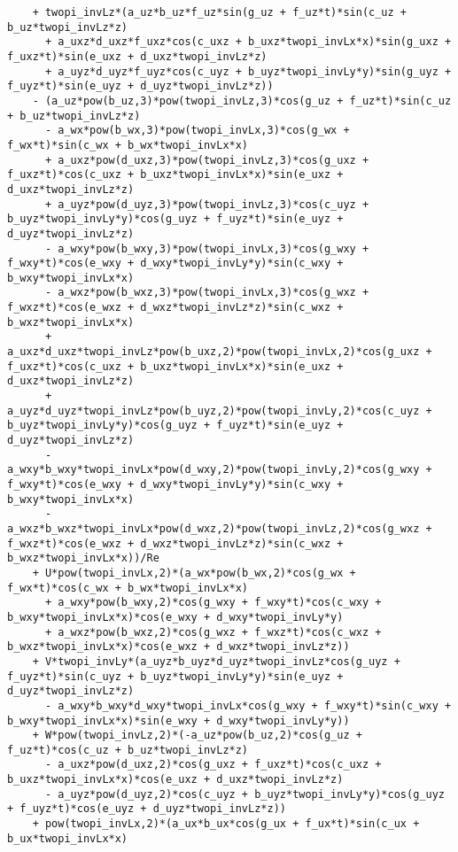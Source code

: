 \documentclass[10pt]{article}
\begin{document}
\begin{landscape}
\begin{footnotesize}
\begin{verbatim}
    + twopi_invLz*(a_uz*b_uz*f_uz*sin(g_uz + f_uz*t)*sin(c_uz + b_uz*twopi_invLz*z) 
      + a_uxz*d_uxz*f_uxz*cos(c_uxz + b_uxz*twopi_invLx*x)*sin(g_uxz + f_uxz*t)*sin(e_uxz + d_uxz*twopi_invLz*z) 
      + a_uyz*d_uyz*f_uyz*cos(c_uyz + b_uyz*twopi_invLy*y)*sin(g_uyz + f_uyz*t)*sin(e_uyz + d_uyz*twopi_invLz*z)) 
    - (a_uz*pow(b_uz,3)*pow(twopi_invLz,3)*cos(g_uz + f_uz*t)*sin(c_uz + b_uz*twopi_invLz*z) 
      - a_wx*pow(b_wx,3)*pow(twopi_invLx,3)*cos(g_wx + f_wx*t)*sin(c_wx + b_wx*twopi_invLx*x) 
      + a_uxz*pow(d_uxz,3)*pow(twopi_invLz,3)*cos(g_uxz + f_uxz*t)*cos(c_uxz + b_uxz*twopi_invLx*x)*sin(e_uxz + d_uxz*twopi_invLz*z) 
      + a_uyz*pow(d_uyz,3)*pow(twopi_invLz,3)*cos(c_uyz + b_uyz*twopi_invLy*y)*cos(g_uyz + f_uyz*t)*sin(e_uyz + d_uyz*twopi_invLz*z) 
      - a_wxy*pow(b_wxy,3)*pow(twopi_invLx,3)*cos(g_wxy + f_wxy*t)*cos(e_wxy + d_wxy*twopi_invLy*y)*sin(c_wxy + b_wxy*twopi_invLx*x) 
      - a_wxz*pow(b_wxz,3)*pow(twopi_invLx,3)*cos(g_wxz + f_wxz*t)*cos(e_wxz + d_wxz*twopi_invLz*z)*sin(c_wxz + b_wxz*twopi_invLx*x) 
      + a_uxz*d_uxz*twopi_invLz*pow(b_uxz,2)*pow(twopi_invLx,2)*cos(g_uxz + f_uxz*t)*cos(c_uxz + b_uxz*twopi_invLx*x)*sin(e_uxz + d_uxz*twopi_invLz*z) 
      + a_uyz*d_uyz*twopi_invLz*pow(b_uyz,2)*pow(twopi_invLy,2)*cos(c_uyz + b_uyz*twopi_invLy*y)*cos(g_uyz + f_uyz*t)*sin(e_uyz + d_uyz*twopi_invLz*z) 
      - a_wxy*b_wxy*twopi_invLx*pow(d_wxy,2)*pow(twopi_invLy,2)*cos(g_wxy + f_wxy*t)*cos(e_wxy + d_wxy*twopi_invLy*y)*sin(c_wxy + b_wxy*twopi_invLx*x) 
      - a_wxz*b_wxz*twopi_invLx*pow(d_wxz,2)*pow(twopi_invLz,2)*cos(g_wxz + f_wxz*t)*cos(e_wxz + d_wxz*twopi_invLz*z)*sin(c_wxz + b_wxz*twopi_invLx*x))/Re 
    + U*pow(twopi_invLx,2)*(a_wx*pow(b_wx,2)*cos(g_wx + f_wx*t)*cos(c_wx + b_wx*twopi_invLx*x) 
      + a_wxy*pow(b_wxy,2)*cos(g_wxy + f_wxy*t)*cos(c_wxy + b_wxy*twopi_invLx*x)*cos(e_wxy + d_wxy*twopi_invLy*y) 
      + a_wxz*pow(b_wxz,2)*cos(g_wxz + f_wxz*t)*cos(c_wxz + b_wxz*twopi_invLx*x)*cos(e_wxz + d_wxz*twopi_invLz*z)) 
    + V*twopi_invLy*(a_uyz*b_uyz*d_uyz*twopi_invLz*cos(g_uyz + f_uyz*t)*sin(c_uyz + b_uyz*twopi_invLy*y)*sin(e_uyz + d_uyz*twopi_invLz*z) 
      - a_wxy*b_wxy*d_wxy*twopi_invLx*cos(g_wxy + f_wxy*t)*sin(c_wxy + b_wxy*twopi_invLx*x)*sin(e_wxy + d_wxy*twopi_invLy*y)) 
    + W*pow(twopi_invLz,2)*(-a_uz*pow(b_uz,2)*cos(g_uz + f_uz*t)*cos(c_uz + b_uz*twopi_invLz*z) 
      - a_uxz*pow(d_uxz,2)*cos(g_uxz + f_uxz*t)*cos(c_uxz + b_uxz*twopi_invLx*x)*cos(e_uxz + d_uxz*twopi_invLz*z) 
      - a_uyz*pow(d_uyz,2)*cos(c_uyz + b_uyz*twopi_invLy*y)*cos(g_uyz + f_uyz*t)*cos(e_uyz + d_uyz*twopi_invLz*z)) 
    + pow(twopi_invLx,2)*(a_ux*b_ux*cos(g_ux + f_ux*t)*sin(c_ux + b_ux*twopi_invLx*x) 

\end{verbatim}
\end{footnotesize}
\end{landscape}
\end{document}
